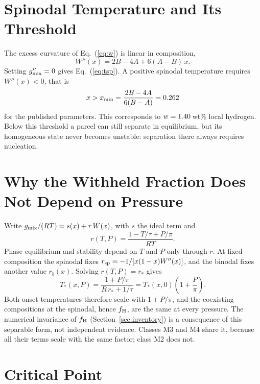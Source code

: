\section{Spinodal Temperature and Its Threshold}

The excess curvature of Eq.~(\ref{eq:w}) is linear in composition,
\begin{equation}
W''(x) = 2B - 4A + 6(A-B)\,x .
\end{equation}
Setting $g_{\rm mix}'' = 0$ gives Eq.~(\ref{eq:tsp}). A positive spinodal temperature
requires $W''(x) < 0$, that is
\begin{equation}
x > x_{\rm min} = \frac{2B-4A}{6(B-A)} = 0.262
\end{equation}
for the published parameters. This corresponds to $w = 1.40{}$\,wt\% local hydrogen.
Below this threshold a parcel can still separate in equilibrium, but its homogeneous state
never becomes unstable: separation there always requires nucleation.

\section{Why the Withheld Fraction Does Not Depend on Pressure}

Write $g_{\rm mix}/(RT) = s(x) + r\,W(x)$, with $s$ the ideal term and
\begin{equation}
r(T,P) = \frac{1 - T/\tau + P/\pi}{RT}.
\end{equation}
Phase equilibrium and stability depend on $T$ and $P$ only through $r$. At fixed composition
the spinodal fixes $r_{\rm sp} = -1/[x(1-x)W''(x)]$, and the binodal fixes another value
$r_b(x)$. Solving $r(T,P) = r_\ast$ gives
\begin{equation}
T_\ast(x,P) = \frac{1+P/\pi}{R\,r_\ast + 1/\tau} = T_\ast(x,0)\left(1+\frac{P}{\pi}\right).
\end{equation}
Both onset temperatures therefore scale with $1+P/\pi$, and the coexisting compositions at the
spinodal, hence $f_{\rm H}$, are the same at every pressure. The numerical invariance of
$f_{\rm H}$ (Section~\ref{sec:inventory}) is a consequence of this separable form, not
independent evidence. Classes M3 and M4 share it, because all their terms scale with the
same factor; class M2 does not.

\section{Critical Point}

